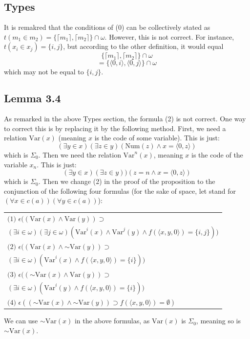 \documentclass{article}
\newcommand*{\oldneg}{\mathord{\sim}}
\theoremstyle{definition}
\begin{document}
\subsection*{Types}
It is remakred that the conditions of (0) can be collectively stated as 
$t(m_1\in m_2)=\{\lceil m_1\rceil, \lceil m_2\rceil\}\cap\omega$. However, this is not correct. For instance, 
$t(x_i\in x_j)=\{i,j\}$, but according to the other definition, it would equal
\[ \{\lceil m_1\rceil, \lceil m_2\rceil\}\cap\omega \]
\[ =\{\langle 0,i\rangle,\langle 0,j\rangle\}\cap\omega \] which may not be equal to $\{i,j\}$.

\subsection*{Lemma 3.4}
As remarked in the above Types section, the formula (2) is not correct. One way to correct this is by replacing it by the following method. First, 
we need a relation $\textrm{Var}(x)$ (meaning $x$ is the code of some variable). This is just:
\[ (\exists y\in x)(\exists z\in y)(\textrm{Num}(z)\wedge x=\langle 0,z\rangle) \]
which is $\Sigma_0$.
Then we need the relation $\textrm{Var}^n(x)$, meaning $x$ is the code of the variable $x_n$. This is just:
\[ (\exists y\in x)(\exists z\in y))(z=n\wedge x=\langle 0,z\rangle) \] 
which is $\Sigma_0$.
Then we change (2) in the proof of the proposition to the conjunction of the following four formulas
(for the sake of space, let \textquote{$\epsilon$} stand for $(\forall x\in c(a))(\forall y\in c(a))$):
\begin{center}
\begin{tabular}{l}
$\textrm{(1) }\epsilon((\textrm{Var}(x)\wedge\textrm{Var}(y))\supset$ \\
		$(\exists i\in\omega)(\exists j\in\omega)(\textrm{Var}^i(x)\wedge\textrm{Var}^j(y)\wedge f(\langle x,y,0\rangle)=\{i,j\}))$ \\
$\textrm{(2) }\epsilon((\textrm{Var}(x)\wedge\oldneg\textrm{Var}(y))\supset$ \\
		$(\exists i\in\omega)(\textrm{Var}^i(x)\wedge f(\langle x,y,0\rangle)=\{i\}))$ \\
$\textrm{(3) }\epsilon((\oldneg\textrm{Var}(x)\wedge\textrm{Var}(y))\supset$ \\
		$(\exists i\in\omega)(\textrm{Var}^i(y)\wedge f(\langle x,y,0\rangle)=\{i\}))$ \\
$\textrm{(4) }\epsilon((\oldneg\textrm{Var}(x)\wedge\oldneg\textrm{Var}(y))\supset f(\langle x,y,0\rangle)=\emptyset)$
\end{tabular}
\end{center}
We can use $\oldneg\textrm{Var}(x)$ in the above formulas, as $\textrm{Var}(x)$ is $\Sigma_0$, meaning so is $\oldneg\textrm{Var}(x)$. 
\end{document}

